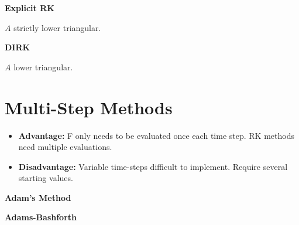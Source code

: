 \documentclass[8pt,a4paper]{scrartcl}
\begin{document}
\begin{multicols*}{3}
\begin{multicols*}{2}



\end{multicols*}

\begin{minipage}{0.45\linewidth}

\textbf{Explicit RK}


$A$ strictly lower triangular.

\end{minipage}
\hfill
\begin{minipage}{0.5\linewidth}

\textbf{DIRK}


$A$ lower triangular.

\end{minipage}

\section*{Multi-Step Methods}


\begin{itemize}
\item \textbf{Advantage:} F only needs to be evaluated once each time step. RK methods need multiple evaluations.
\item \textbf{Disadvantage:} Variable time-steps difficult to implement. Require several starting values.
\end{itemize}


\begin{minipage}[t]{0.45\linewidth}
\textbf{Adam's Method}

\end{minipage}
\hfill
\begin{minipage}[t]{0.45\linewidth}
\textbf{Adams-Bashforth}


\end{minipage}
\end{multicols*}
\end{document}
